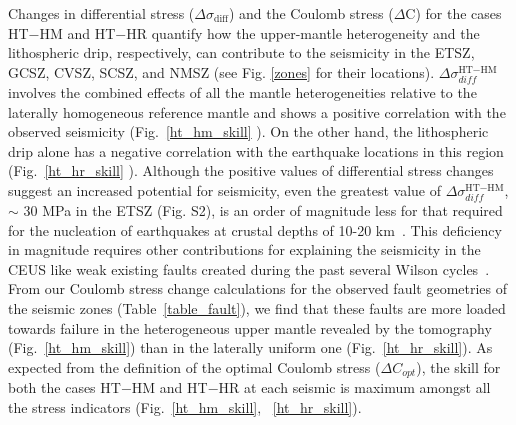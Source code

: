 \documentclass[draft,linenumbers]{agujournal2018}
\begin{document}
Changes in differential stress ($\Delta \sigma_{\text{diff}}$) and the Coulomb stress ($\Delta$C) for the cases HT$-$HM and HT$-$HR quantify how the upper-mantle heterogeneity and the lithospheric drip, respectively, can contribute to the seismicity in the ETSZ, GCSZ, CVSZ, SCSZ, and NMSZ (see Fig. \ref{zones} for their locations).
$\Delta\sigma_{diff}^{\text{HT}-\text{HM}}$ involves the combined effects of all the mantle heterogeneities relative to the laterally homogeneous reference mantle and shows a positive correlation with the observed seismicity  (Fig.~\ref{ht_hm_skill} ). On the other hand, the lithospheric drip alone has a negative correlation with the earthquake locations in this region (Fig.~\ref{ht_hr_skill} ). Although the positive values of differential stress changes suggest an increased potential for seismicity, even the greatest value of $\Delta\sigma_{diff}^{\text{HT}-\text{HM}}$, $\sim$ 30 MPa in the ETSZ (Fig. S2), is an order of magnitude less for that required for the nucleation of earthquakes at crustal depths of 10-20 km~\citep[e.g.][]{sibson1990rupture}. This deficiency in magnitude requires other contributions for explaining the seismicity in the CEUS like weak existing faults created during the past several Wilson cycles~\citep{thomas2006tectonic}. From our Coulomb stress change calculations for the observed fault geometries of the seismic zones (Table~\ref{table_fault}), we find that these faults are more loaded towards failure  in the heterogeneous upper mantle revealed by the tomography (Fig.~\ref{ht_hm_skill})  than in the laterally uniform one (Fig.~\ref{ht_hr_skill}). As expected from the definition of the optimal Coulomb stress ($\Delta C_{opt}$), the skill for both the cases HT$-$HM and HT$-$HR at each seismic is maximum amongst all the stress indicators (Fig.~\ref{ht_hm_skill}, ~\ref{ht_hr_skill}). 
       
       
    
\end{document}
